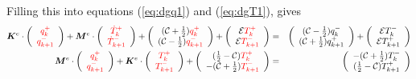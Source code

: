 Filling this into equations (\ref{eq:dgq1}) and (\ref{eq:dgT1}), gives 
\begin{eqnarray}
{\bm K}^e \cdot 
\left( 
\begin{array}{cc}
    {\color{red}q_k^+}  \\
    {\color{red}q_{k+1}^-}
\end{array}
\right)
+
{\bm M}^e \cdot 
\left(
\begin{array}{c}
{\color{red}\dot{T}_k^+}  \\
{\color{red}\dot{T}_{k+1}^-} 
\end{array}
\right) 
+ 
\left(
\begin{array}{cc}
     ({\cal C}+\frac{1}{2})  {\color{red}q_k^+}  \\
     ({\cal C}-\frac{1}{2})  {\color{red}q_{k+1}^-} 
\end{array}
\right)+
\left(
\begin{array}{c}
     {\cal E}    {\color{red}T_k^+}  \\
     {\cal E}    {\color{red}T_{k+1}^-} 
\end{array}
\right) 
&=& 
\left(
\begin{array}{cc}
     ({\cal C}-\frac{1}{2}) q_k^-  \\
     ({\cal C}+\frac{1}{2}) q_{k+1}^+ 
\end{array}
\right)
+ \left(
\begin{array}{cc}
     {\cal E}   T_k^-  \\
     {\cal E}   T_{k+1}^+
\end{array}
\right)  
\nonumber
\\
{\bm M}^e \cdot
\left(
\begin{array}{cc}
    {\color{red}q_k^+}  \\
    {\color{red}q_{k+1}^-}
\end{array}
\right)+
{\bm K}^e \cdot
\left(
\begin{array}{cc}
 {\color{red}T_k^+}  \\
{\color{red}T_{k+1}^-} 
\end{array}
\right) 
+ \left(
\begin{array}{cc}
     (\frac{1}{2}-{\cal C}) {\color{red}T_k^+}  \\
     -({\cal C}+\frac{1}{2}){\color{red}T_{k+1}^-} 
\end{array}
\right)
&=& \left(
\begin{array}{cc}
     -({\cal C}+\frac{1}{2})  T_k^- \\
     (\frac{1}{2}-{\cal C})  T_{k+1}^+ 
\end{array}
\right) 
\end{eqnarray}

